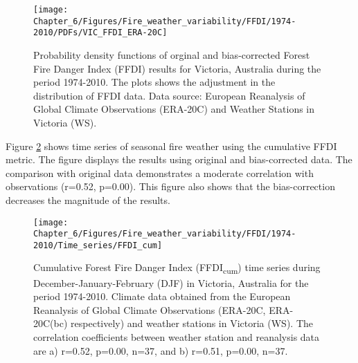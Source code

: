 \begin{figure}[h]
\noindent \begin{centering}
\texttt{[image: Chapter\_6/Figures/Fire\_weather\_variability/FFDI/1974-2010/PDFs/VIC\_FFDI\_ERA-20C]}
\par\end{centering}

\caption[Probability density functions of orginal and bias-corrected Forest
Fire Danger Index (FFDI) results for Victoria, Australia during the
period 1974-2010]{Probability density functions of orginal and bias-corrected Forest
Fire Danger Index (FFDI) results for Victoria, Australia during the
period 1974-2010. The plots shows the adjustment in the distribution
of FFDI data. Data source: European Reanalysis of Global Climate Observations
(ERA-20C) and Weather Stations in Victoria (WS). \label{fig:Probability density functions of orginal and bias-corrected Forest Fire Danger Index results for Victoria, Australia during the period 1974-2010 (r)}}
\end{figure}


Figure \ref{fig: Cumulative Forest Fire Danger Index time series during December-January-February in Victoria, Australia for the period 1974-2010 (r)}
shows time series of seasonal fire weather using the cumulative FFDI
metric. The figure displays the results using original and bias-corrected
data. The comparison with original data demonstrates a moderate correlation
with observations (r=0.52, p=0.00). This figure also shows that the
bias-correction decreases the magnitude of the results. 

\begin{figure}[h]
\noindent \begin{centering}
\texttt{[image: Chapter\_6/Figures/Fire\_weather\_variability/FFDI/1974-2010/Time\_series/FFDI\_cum]}
\par\end{centering}

\caption[Cumulative Forest Fire Danger Index (FFDI\protect\textsubscript{cum})
time series during December-January-February (DJF) in Victoria, Australia
for the period 1974-2010]{Cumulative Forest Fire Danger Index (FFDI\protect\textsubscript{cum})
time series during December-January-February (DJF) in Victoria, Australia
for the period 1974-2010. Climate data obtained from the European
Reanalysis of Global Climate Observations (ERA-20C, ERA-20C(bc) respectively)
and weather stations in Victoria (WS). The correlation coefficients
between weather station and reanalysis data are a) r=0.52, p=0.00,
n=37, and b) r=0.51, p=0.00, n=37. \label{fig: Cumulative Forest Fire Danger Index time series during December-January-February in Victoria, Australia for the period 1974-2010 (r)} }
\end{figure}



